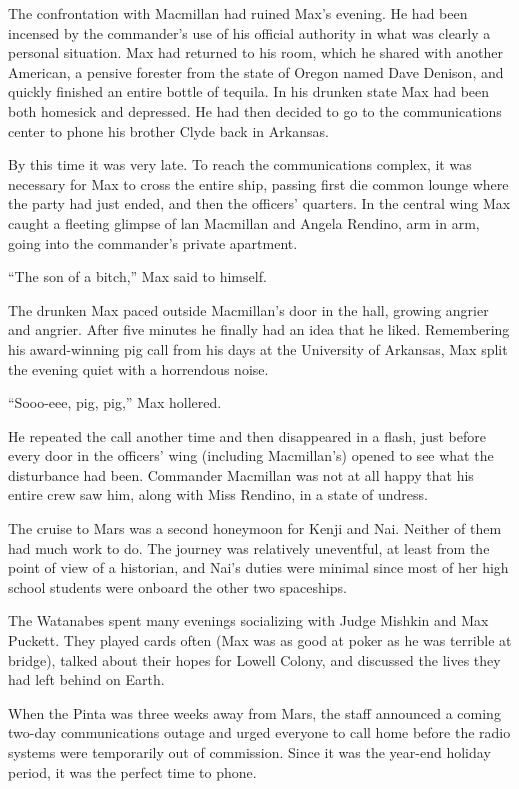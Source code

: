 \documentclass[]{article}
\begin{document}
{The confrontation with Macmillan had ruined Max’s evening.  He had been incensed by the commander’s use of his official authority in what was clearly a personal situation.  Max had returned to his room, which he shared with another American, a pensive forester from the state of Oregon named Dave Denison, and quickly finished an entire bottle of tequila.  In his drunken state Max had been both homesick and depressed.  He had then decided to go to the communications center to phone his brother Clyde back in Arkansas.

By this time it was very late.  To reach the communications complex, it was necessary for Max to cross the entire ship, passing first die common lounge where the party had just ended, and then the officers’ quarters.  In the central wing Max caught a fleeting glimpse of lan Macmillan and Angela Rendino, arm in arm, going into the commander’s private apartment.

“The son of a bitch,” Max said to himself.

The drunken Max paced outside Macmillan’s door in the hall, growing angrier and angrier.  After five minutes he finally had an idea that he liked.  Remembering his award-winning pig call from his days at the University of Arkansas, Max split the evening quiet with a horrendous noise.

“Sooo-eee, pig, pig,” Max hollered.

He repeated the call another time and then disappeared in a flash, just before every door in the officers’ wing (including Macmillan’s) opened to see what the disturbance had been.  Commander Macmillan was not at all happy that his entire crew saw him, along with Miss Rendino, in a state of undress.

The cruise to Mars was a second honeymoon for Kenji and Nai.  Neither of them had much work to do.  The journey was relatively uneventful, at least from the point of view of a historian, and Nai’s duties were minimal since most of her high school students were onboard the other two spaceships.

The Watanabes spent many evenings socializing with Judge Mishkin and Max Puckett.  They played cards often (Max was as good at poker as he was terrible at bridge), talked about their hopes for Lowell Colony, and discussed the lives they had left behind on Earth.

When the Pinta was three weeks away from Mars, the staff announced a coming two-day communications outage and urged everyone to call home before the radio systems were temporarily out of commission.  Since it was the year-end holiday period, it was the perfect time to phone.

}
\end{document}
